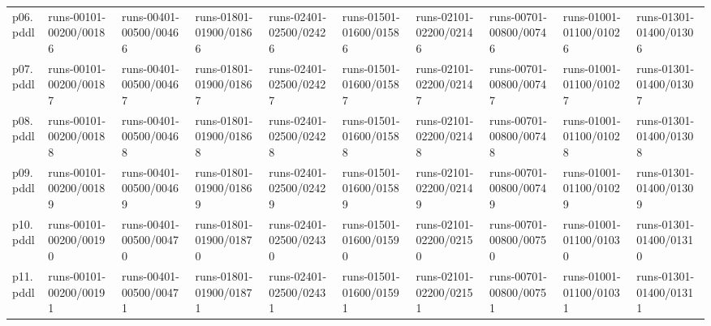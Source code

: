 \documentclass{article}
\begin{document}
\begin{tabular}{@{}lrrrrrrrrr@{}}
p06.pddl & \multicolumn{1}{|l|}{runs-00101-00200/00186} & \multicolumn{1}{|l|}{runs-00401-00500/00466} & \multicolumn{1}{|l|}{runs-01801-01900/01866} & \multicolumn{1}{|l|}{runs-02401-02500/02426} & \multicolumn{1}{|l|}{runs-01501-01600/01586} & \multicolumn{1}{|l|}{runs-02101-02200/02146} & \multicolumn{1}{|l|}{runs-00701-00800/00746} & \multicolumn{1}{|l|}{runs-01001-01100/01026} & \multicolumn{1}{|l|}{runs-01301-01400/01306} \\
p07.pddl & \multicolumn{1}{|l|}{runs-00101-00200/00187} & \multicolumn{1}{|l|}{runs-00401-00500/00467} & \multicolumn{1}{|l|}{runs-01801-01900/01867} & \multicolumn{1}{|l|}{runs-02401-02500/02427} & \multicolumn{1}{|l|}{runs-01501-01600/01587} & \multicolumn{1}{|l|}{runs-02101-02200/02147} & \multicolumn{1}{|l|}{runs-00701-00800/00747} & \multicolumn{1}{|l|}{runs-01001-01100/01027} & \multicolumn{1}{|l|}{runs-01301-01400/01307} \\
p08.pddl & \multicolumn{1}{|l|}{runs-00101-00200/00188} & \multicolumn{1}{|l|}{runs-00401-00500/00468} & \multicolumn{1}{|l|}{runs-01801-01900/01868} & \multicolumn{1}{|l|}{runs-02401-02500/02428} & \multicolumn{1}{|l|}{runs-01501-01600/01588} & \multicolumn{1}{|l|}{runs-02101-02200/02148} & \multicolumn{1}{|l|}{runs-00701-00800/00748} & \multicolumn{1}{|l|}{runs-01001-01100/01028} & \multicolumn{1}{|l|}{runs-01301-01400/01308} \\
p09.pddl & \multicolumn{1}{|l|}{runs-00101-00200/00189} & \multicolumn{1}{|l|}{runs-00401-00500/00469} & \multicolumn{1}{|l|}{runs-01801-01900/01869} & \multicolumn{1}{|l|}{runs-02401-02500/02429} & \multicolumn{1}{|l|}{runs-01501-01600/01589} & \multicolumn{1}{|l|}{runs-02101-02200/02149} & \multicolumn{1}{|l|}{runs-00701-00800/00749} & \multicolumn{1}{|l|}{runs-01001-01100/01029} & \multicolumn{1}{|l|}{runs-01301-01400/01309} \\
p10.pddl & \multicolumn{1}{|l|}{runs-00101-00200/00190} & \multicolumn{1}{|l|}{runs-00401-00500/00470} & \multicolumn{1}{|l|}{runs-01801-01900/01870} & \multicolumn{1}{|l|}{runs-02401-02500/02430} & \multicolumn{1}{|l|}{runs-01501-01600/01590} & \multicolumn{1}{|l|}{runs-02101-02200/02150} & \multicolumn{1}{|l|}{runs-00701-00800/00750} & \multicolumn{1}{|l|}{runs-01001-01100/01030} & \multicolumn{1}{|l|}{runs-01301-01400/01310} \\
p11.pddl & \multicolumn{1}{|l|}{runs-00101-00200/00191} & \multicolumn{1}{|l|}{runs-00401-00500/00471} & \multicolumn{1}{|l|}{runs-01801-01900/01871} & \multicolumn{1}{|l|}{runs-02401-02500/02431} & \multicolumn{1}{|l|}{runs-01501-01600/01591} & \multicolumn{1}{|l|}{runs-02101-02200/02151} & \multicolumn{1}{|l|}{runs-00701-00800/00751} & \multicolumn{1}{|l|}{runs-01001-01100/01031} & \multicolumn{1}{|l|}{runs-01301-01400/01311} \\

\end{tabular}
\end{document}
